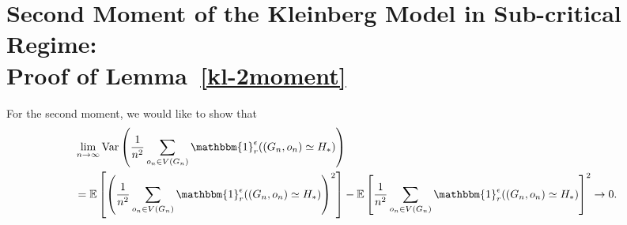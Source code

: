 \documentclass[10pt]{amsart}
\begin{document}
\section{Second Moment of the Kleinberg Model in Sub-critical Regime: \\ Proof of Lemma~\ref{kl-2moment}} \label{proof-kl-2moment}

For the second moment, we would like to show that 
\begin{equation} \label{goal-3}
    \begin{split}
        &\lim_{n \to \infty}\text{Var}\left(\frac{1}{n^2} \sum_{o_n\in V(G_n)}  \mathbbm{1}_r^\epsilon((G_n,o_n)\simeq H_* )  \right) \\ &=\mathbb{E}\left[\left(\frac{1}{n^2} \sum_{o_n\in V(G_n)}  \mathbbm{1}_r^\epsilon((G_n,o_n)\simeq H_*) \right)^2 \right] - \mathbb{E}\left[\frac{1}{n^2} \sum_{o_n\in V(G_n)}  \mathbbm{1}_r^\epsilon((G_n,o_n)\simeq H_*)  \right]^2 \to 0.
    \end{split}
\end{equation}
\end{document}
